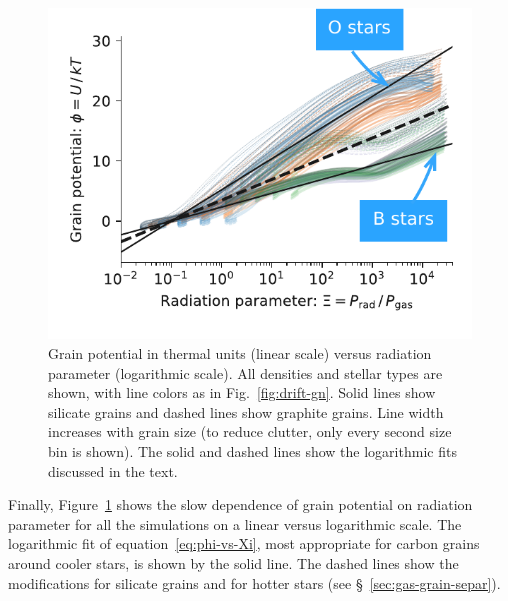 \begin{figure}
  \centering
  \includegraphics[width=\linewidth]{figs/phi-versus-xi-annotate}
  \caption{Grain potential in thermal units (linear scale) versus
    radiation parameter (logarithmic scale). All densities and stellar
    types are shown, with line colors as in Fig.~\ref{fig:drift-gn}.
    Solid lines show silicate grains and dashed lines show graphite
    grains.  Line width increases with grain size (to reduce clutter,
    only every second size bin is shown).  The solid and dashed lines
    show the logarithmic fits discussed in the text.}
  \label{fig:phi-vs-Xi}
\end{figure}
Finally, Figure~\ref{fig:phi-vs-Xi} shows the slow dependence of grain
potential on radiation parameter for all the simulations on a linear versus
logarithmic scale.  The logarithmic fit of
equation~\eqref{eq:phi-vs-Xi}, most appropriate for carbon grains
around cooler stars, is shown by the solid line.  The dashed lines
show the modifications for silicate grains and for hotter stars (see
\S~\ref{sec:gas-grain-separ}).

